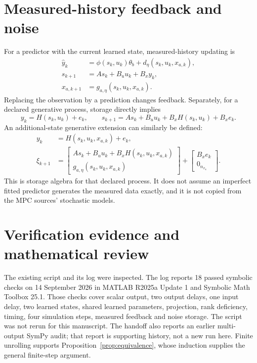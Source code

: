 \documentclass[11pt,a4paper]{article}
\begin{document}
\section{Measured-history feedback and noise}\label{sec:noise}
For a predictor with the current learned state, measured-history updating is
\begin{equation}\label{eq:observedupdate}
\begin{aligned}
\hat y_k&=\phi(s_k,u_k)\theta_b+d_\eta(s_k,u_k,x_{a,k}),\\
s_{k+1}&=As_k+B_u u_k+B_xy_k,\\
x_{a,k+1}&=g_{a,\eta}(s_k,u_k,x_{a,k}).
\end{aligned}
\end{equation}
Replacing the observation by a prediction changes feedback. Separately, for a declared generative process, storage directly implies
\begin{equation}\label{eq:noisebaseline}
y_k=H(s_k,u_k)+e_k,\qquad
s_{k+1}=As_k+B_u u_k+B_xH(s_k,u_k)+B_xe_k.
\end{equation}
An additional-state generative extension can similarly be defined:
\begin{equation}\label{eq:noiselatent}
\begin{aligned}
y_k&=H(s_k,u_k,x_{a,k})+e_k,\\
\xi_{k+1}&=\begin{bmatrix}As_k+B_u u_k+B_xH(s_k,u_k,x_{a,k})\\g_{a,\eta}(s_k,u_k,x_{a,k})\end{bmatrix}
+\begin{bmatrix}B_xe_k\\0_{n_{x_a}}\end{bmatrix}.
\end{aligned}
\end{equation}
This is storage algebra for that declared process. It does not assume an imperfect fitted predictor generates the measured data exactly, and it is not copied from the MPC sources' stochastic models.

\section{Verification evidence and mathematical review}
The existing script  and its log  were inspected. The log reports 18 passed symbolic checks on 14 September 2026 in MATLAB R2025a Update 1 and Symbolic Math Toolbox 25.1. Those checks cover scalar output, two output delays, one input delay, two learned states, shared learned parameters, projection, rank deficiency, timing, four simulation steps, measured feedback and noise storage. The script was not rerun for this manuscript. The handoff also reports an earlier multi-output SymPy audit; that report is supporting history, not a new run here. Finite unrolling supports Proposition~\ref{prop:equivalence}, whose induction supplies the general finite-step argument.
\end{document}
